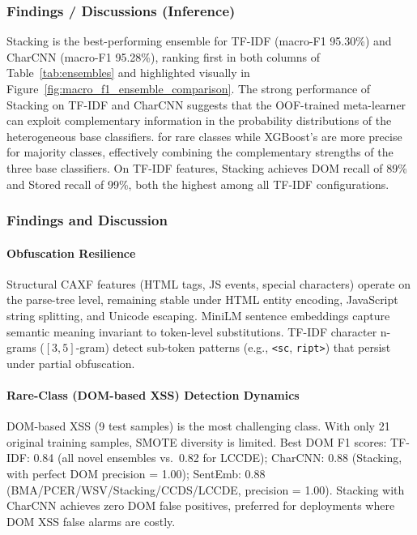 \documentclass[11pt,a4paper]{article}
\begin{document}
\subsubsection{Findings / Discussions (Inference)}

Stacking is the best-performing ensemble for TF-IDF (macro-F1 95.30\%) and CharCNN (macro-F1
95.28\%), ranking first in both columns of Table~\ref{tab:ensembles} and highlighted visually in Figure~\ref{fig:macro_f1_ensemble_comparison}. The strong performance of Stacking on TF-IDF and CharCNN suggests that the OOF-trained meta-learner can exploit complementary information in the probability distributions of the heterogeneous base classifiers. for
rare classes while XGBoost's are more precise for majority classes, effectively combining the
complementary strengths of the three base classifiers. On TF-IDF features, Stacking achieves
DOM recall of 89\% and Stored recall of 99\%, both the highest among all TF-IDF configurations.

\subsubsection{Findings and Discussion}

\paragraph{Obfuscation Resilience}
Structural CAXF features (HTML tags, JS events, special characters) operate
on the parse-tree level, remaining stable under HTML entity encoding,
JavaScript string splitting, and Unicode escaping. MiniLM sentence embeddings
capture semantic meaning invariant to token-level substitutions. TF-IDF
character n-grams ($[3,5]$-gram) detect sub-token patterns (e.g.,
\texttt{<sc}, \texttt{ript>}) that persist under partial obfuscation.

\paragraph{Rare-Class (DOM-based XSS) Detection Dynamics}
DOM-based XSS (9 test samples) is the most challenging class. With only
21 original training samples, SMOTE diversity is limited. Best DOM F1
scores: TF-IDF: 0.84 (all novel ensembles vs.\ 0.82 for LCCDE);
CharCNN: 0.88 (Stacking, with perfect DOM precision = 1.00);
SentEmb: 0.88 (BMA/PCER/WSV/Stacking/CCDS/LCCDE, precision = 1.00).
Stacking with CharCNN achieves zero DOM false positives, preferred for
deployments where DOM XSS false alarms are costly.
\end{document}
